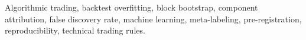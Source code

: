 \documentclass[journal]{IEEEtran}
\begin{document}
\begin{IEEEkeywords}
Algorithmic trading, backtest overfitting, block bootstrap, component attribution, false discovery rate, machine
learning, meta-labeling, pre-registration, reproducibility, technical trading rules.
\end{IEEEkeywords}














\end{document}

